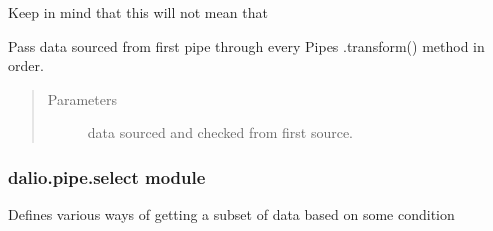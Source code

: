 \documentclass[letterpaper,10pt,english]{sphinxmanual}
\begin{document}
\begin{fulllineitems}
\begin{fulllineitems}
Keep in mind that this will not mean that

\end{fulllineitems}


\begin{fulllineitems}
\label{\detokenize{dalio.pipe:dalio.pipe.pipe.PipeLine.transform}}
Pass data sourced from first pipe through every Pipe\textasciigrave{}s
.transform() method in order.
\begin{quote}\begin{description}
\item[{Parameters}] \leavevmode
{} \textendash{} data sourced and checked from first source.

\end{description}\end{quote}

\end{fulllineitems}


\end{fulllineitems}



\subsubsection{dalio.pipe.select module}
\label{\detokenize{dalio.pipe:module-dalio.pipe.select}}\label{\detokenize{dalio.pipe:dalio-pipe-select-module}}
Defines various ways of getting a subset of data based on some condition
\end{document}
